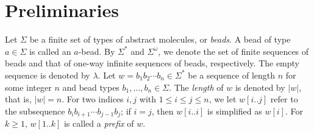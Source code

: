 \documentclass[runningheads]{llncs}
\begin{document}
	\section{Preliminaries}


Let $\Sigma$ be a finite set of types of abstract molecules, or \textit{beads}. 
A bead of type $a \in \Sigma$ is called an $a$-bead. 
By $\Sigma^*$ and $\Sigma^\omega$, we denote the set of finite sequences of beads and that of one-way infinite sequences of beads, respectively. 
The empty sequence is denoted by $\lambda$. 
Let $w = b_1 b_2 \cdots b_n \in \Sigma^*$ be a sequence of length $n$ for some integer $n$ and bead types $b_1, \ldots, b_n \in \Sigma$. 
The \textit{length} of $w$ is denoted by $|w|$, that is, $|w| = n$. %
For two indices $i, j$ with $1 \le i \le j \le n$, we let $w[i..j]$ refer to the subsequence $b_i b_{i+1} \cdots b_{j-1}b_j$; if $i = j$, then $w[i..i]$ is simplified as $w[i]$. 
For $k \ge 1$, $w[1..k]$ is called a \textit{prefix} of $w$. 
\end{document}
